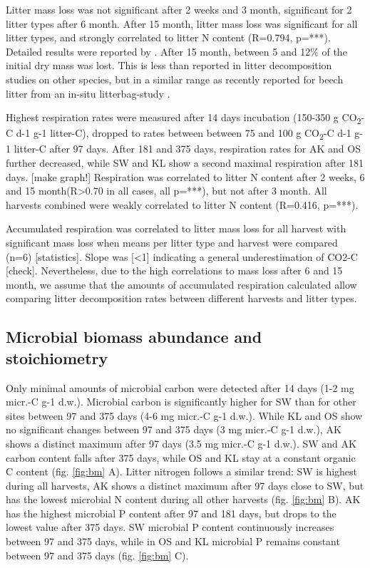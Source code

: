 Litter mass loss was not significant after 2 weeks and 3 month, significant for 2 litter types after 6 month. After 15 month, litter mass loss was significant for all litter types, and strongly correlated to litter N content (R=0.794, p=***). Detailed results were reported by \citep{Mooshammer2011}. After 15 month, between 5 and 12\% of the initial dry mass was lost. This is less than reported in litter decomposition studies on other species, but in a similar range as recently reported for beech litter from an in-situ litterbag-study \citep{Kalbitz2006} .

Highest respiration rates were measured after 14 days incubation (150-350 \textmu g CO\textsubscript{2}-C d-1 g-1 litter-C), dropped to rates between between 75 and 100 \textmu g CO\textsubscript{2}-C d-1 g-1 litter-C after 97 days. After 181 and 375 days, respiration rates for AK and OS further decreased, while SW and KL show a second maximal respiration after 181 days. [make graph!] Respiration was correlated to litter N content after 2 weeks, 6 and 15 month(R\textgreater 0.70 in all cases, all p=***), but not after 3 month. All harvests combined were weakly correlated to litter N content (R=0.416, p=***).

Accumulated respiration was correlated to litter mass loss for all harvest with significant mass loss when means per litter type and harvest were compared (n=6) [statistics]. Slope was [\textless 1] indicating a general underestimation of CO2-C [check]. Nevertheless, due to the high correlations to mass loss after 6 and 15 month, we assume that the amounts of accumulated respiration calculated allow comparing litter decomposition rates between different harvests and litter types.

\subsection{Microbial biomass abundance and stoichiometry}

Only minimal amounts of microbial carbon were detected after 14 days (1-2 mg micr.-C g-1 d.w.). Microbial carbon is significantly higher for SW than for other sites between 97 and 375 days (4-6 mg micr.-C g-1 d.w.). While KL and OS show no significant changes between 97 and 375 days (3 mg micr.-C g-1 d.w.), AK shows a distinct maximum after 97 days (3.5 mg micr.-C g-1 d.w.). SW and AK carbon content falls after 375 days, while OS and KL stay at a constant organic C content (fig. \ref{fig:bm} A). Litter nitrogen follows a similar trend: SW is highest during all harvests, AK shows a distinct maximum after 97 days close to SW, but has the lowest microbial N content during all other harvests (fig. \ref{fig:bm} B). AK has the highest microbial P content after 97 and 181 days, but drops to the lowest value after 375 days. SW microbial P content continuously increases between 97 and 375 days, while in OS and KL microbial P remains constant between 97 and 375 days (fig. \ref{fig:bm} C). 

